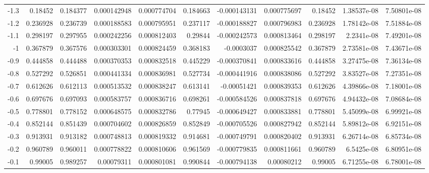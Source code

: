 {\begin{tabular}{rrrrrrrrrrr}
 -1.3         & 0.18452    & 0.184377   &   0.000142948 &   0.000774704 & 0.184663   &  -0.000143131 &   0.000775697 & 0.18452    &   1.38537e-08 &   7.50801e-08 \\
 -1.2         & 0.236928   & 0.236739   &   0.000188583 &   0.000795951 & 0.237117   &  -0.000188827 &   0.000796983 & 0.236928   &   1.78142e-08 &   7.51884e-08 \\
 -1.1         & 0.298197   & 0.297955   &   0.000242256 &   0.000812403 & 0.29844    &  -0.000242573 &   0.000813464 & 0.298197   &   2.2341e-08  &   7.49201e-08 \\
 -1           & 0.367879   & 0.367576   &   0.000303301 &   0.000824459 & 0.368183   &  -0.0003037   &   0.000825542 & 0.367879   &   2.73581e-08 &   7.43671e-08 \\
 -0.9         & 0.444858   & 0.444488   &   0.000370353 &   0.000832518 & 0.445229   &  -0.000370841 &   0.000833616 & 0.444858   &   3.27475e-08 &   7.36134e-08 \\
 -0.8         & 0.527292   & 0.526851   &   0.000441334 &   0.000836981 & 0.527734   &  -0.000441916 &   0.000838086 & 0.527292   &   3.83527e-08 &   7.27351e-08 \\
 -0.7         & 0.612626   & 0.612113   &   0.000513532 &   0.000838247 & 0.613141   &  -0.00051421  &   0.000839353 & 0.612626   &   4.39866e-08 &   7.18001e-08 \\
 -0.6         & 0.697676   & 0.697093   &   0.000583757 &   0.000836716 & 0.698261   &  -0.000584526 &   0.000837818 & 0.697676   &   4.94432e-08 &   7.08684e-08 \\
 -0.5         & 0.778801   & 0.778152   &   0.000648575 &   0.000832786 & 0.77945    &  -0.000649427 &   0.000833881 & 0.778801   &   5.45099e-08 &   6.99921e-08 \\
 -0.4         & 0.852144   & 0.851439   &   0.000704602 &   0.000826859 & 0.852849   &  -0.000705526 &   0.000827942 & 0.852144   &   5.89812e-08 &   6.92151e-08 \\
 -0.3         & 0.913931   & 0.913182   &   0.000748813 &   0.000819332 & 0.914681   &  -0.000749791 &   0.000820402 & 0.913931   &   6.26714e-08 &   6.85734e-08 \\
 -0.2         & 0.960789   & 0.960011   &   0.000778822 &   0.000810606 & 0.961569   &  -0.000779835 &   0.000811661 & 0.960789   &   6.5425e-08  &   6.80951e-08 \\
 -0.1         & 0.99005    & 0.989257   &   0.00079311  &   0.000801081 & 0.990844   &  -0.000794138 &   0.00080212  & 0.99005    &   6.71255e-08 &   6.78001e-08 \\

\end{tabular}}
